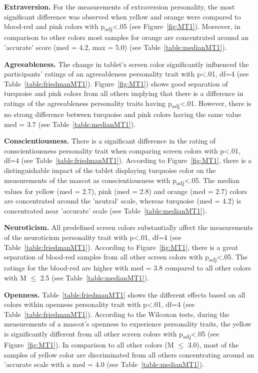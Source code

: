 \par\textbf{Extraversion.}
For the measurements of extraversion personality,
the most significant difference was observed when yellow and orange were compared to
blood-red and pink colors with p\textsubscript{adj}<.05 (see Figure~\ref{fig:MT1}).
Moreover, in comparison to other colors most samples for orange are concentrated around
an 'accurate' score (med = 4.2, max = 5.0) (see Table~\ref{table:medianMT1}).

\par\textbf{Agreeableness.}
The change in tablet's screen color significantly influenced the participants' ratings of
an agreeableness personality trait with p<.01, df=4 (see Table~\ref{table:friedmanMT1}).
Figure~\ref{fig:MT1}) shows good separation of turquoise and pink colors
from all others implying that there is a difference in ratings of the
agreeableness personality traits having p\textsubscript{adj}<.01.
However, there is no strong difference between turquoise and pink colors having
the same value med = 3.7 (see Table~\ref{table:medianMT1}).

\par\textbf{Conscientiousness.}
There is a significant difference in the rating of conscientiousness personality trait
when comparing screen colors with p<.01, df=4 (see Table~\ref{table:friedmanMT1}).
According to Figure~\ref{fig:MT1}, there is a distinguishable impact of the
tablet displaying turquoise color on the measurements of the mascot as conscientiousness with p\textsubscript{adj}<.05.
The median values for yellow (med = 2.7), pink (med = 2.8) and orange (med = 2.7) colors are
concentrated around the 'neutral' scale, whereas turquoise (med = 4.2)
is concentrated near 'accurate' scale (see Table~\ref{table:medianMT1}).

\par\textbf{Neuroticism.}
All predefined screen colors substantially affect the measurements of the neuroticism personality
trait with p<.01, df=4 (see Table~\ref{table:friedmanMT1}).
According to Figure~\ref{fig:MT1}, there is a great separation of blood-red
samples from all other screen colors with p\textsubscript{adj}<.05.
The ratings for the blood-red are higher with med = 3.8 compared to all other colors
with M $\leq$ 2.5 (see Table~\ref{table:medianMT1}).

\par\textbf{Openness.}
Table~\ref{table:friedmanMT1} shows the different effects based on all colors within openness
personality trait with p<.01, df=4 (see Table~\ref{table:friedmanMT1}).
According to the Wilcoxon tests, during the measurements of a mascot's openness to experience
personality traits, the yellow is significantly different from all other screen
colors with p\textsubscript{adj}<.05 (see Figure~\ref{fig:MT1}).
In comparison to all other colors (M $\leq$ 3.0), most of the samples of yellow color are discriminated
from all others concentrating around an 'accurate scale with a med = 4.0 (see Table~\ref{table:medianMT1}).

